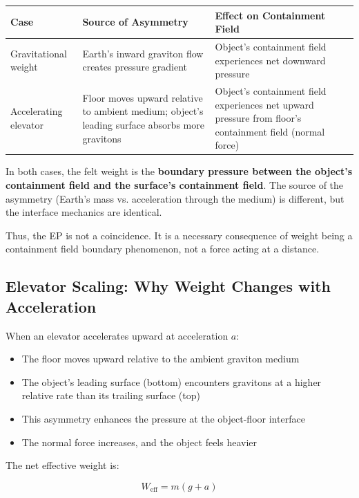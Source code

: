 \documentclass[12pt, a4paper]{article}
\begin{document}
\begin{center}
\begin{tabular}{|p{4cm}|p{5cm}|p{5cm}|}
\hline
\textbf{Case} & \textbf{Source of Asymmetry} & \textbf{Effect on Containment Field} \\
\hline
Gravitational weight & Earth's inward graviton flow creates pressure gradient & Object's containment field experiences net downward pressure \\
\hline
Accelerating elevator & Floor moves upward relative to ambient medium; object's leading surface absorbs more gravitons & Object's containment field experiences net upward pressure from floor's containment field (normal force) \\
\hline
\end{tabular}
\end{center}

In both cases, the felt weight is the \textbf{boundary pressure between the object's containment field and the surface's containment field}. The source of the asymmetry (Earth's mass vs. acceleration through the medium) is different, but the interface mechanics are identical.

Thus, the EP is not a coincidence. It is a necessary consequence of weight being a containment field boundary phenomenon, not a force acting at a distance.

\subsection{Elevator Scaling: Why Weight Changes with Acceleration}
\label{subsec:elevator_scaling}

When an elevator accelerates upward at acceleration \( a \):

\begin{itemize}
    \item The floor moves upward relative to the ambient graviton medium
    \item The object's leading surface (bottom) encounters gravitons at a higher relative rate than its trailing surface (top)
    \item This asymmetry enhances the pressure at the object-floor interface
    \item The normal force increases, and the object feels heavier
\end{itemize}

The net effective weight is:

\[
W_{\text{eff}} = m(g + a)
\]
\end{document}
